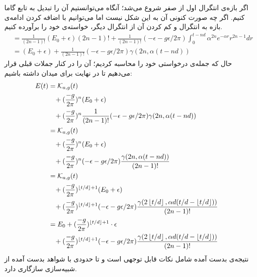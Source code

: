 اگر بازه‌ی انتگرال اول از صفر شروع می‌شد؛ آنگاه می‌توانستیم آن را تبدیل به تابع گاما کنیم. اگر چه صورت کنونی آن به این شکل نیست اما می‌توانیم با اضافه کردن ادامه‌ی بازه به انتگرال و کم کردن آن از انتگرال دیگر، خواسته‌ی خود را برآورده کنیم.
\begin{align}
	&= \frac{1}{(2n-1)!} (E_0 + \epsilon) (2n - 1)! + \frac{1}{(2n-1)!} ( - \epsilon - g\epsilon/2\pi) \int_{0}^{t - nd} \alpha^{2n} e^{-\alpha r} r^{2n-1} dr\\
	&= (E_0 + \epsilon) + \frac{1}{(2n-1)!} ( - \epsilon - g\epsilon/2\pi) \gamma(2n,\alpha( t-nd))
\end{align}
حال که جمله‌ی درخواستی خود را محاسبه کردیم؛ آن را در کنار جملات قبلی قرار می‌دهیم تا در نهایت برای میدان داشته باشیم:
\begin{align}
	E(t) &= \mathcal{K}_{a,g}(t) \\
	&\hspace{3mm}+ (\frac{-g}{2\pi})^n (E_0 + \epsilon) \\
	&\hspace{3mm}+ (\frac{-g}{2\pi})^n \frac{1}{(2n-1)!} ( - \epsilon - g\epsilon/2\pi) \gamma(2n,\alpha( t-nd))\\
	&= \mathcal{K}_{a,g}(t) \\
	&\hspace{3mm}+ (\frac{-g}{2\pi})^n (E_0 + \epsilon)\\
	&\hspace{3mm}+ (\frac{-g}{2\pi})^n ( - \epsilon - g\epsilon/2\pi) \frac{\gamma(2n,\alpha( t-nd))}{(2n-1)!}\\
	&= \mathcal{K}_{a,g}(t) \\
	&\hspace{3mm}+ (\frac{-g}{2\pi})^{\left\lfloor t/d \right\rfloor+1} (E_0 + \epsilon)\\
	&\hspace{3mm}+ (\frac{-g}{2\pi})^{\left\lfloor t/d \right\rfloor + 1} ( - \epsilon - g\epsilon/2\pi) \frac{\gamma(2\left\lfloor t/d \right\rfloor,\alpha d( t/d - \left\lfloor t/d \right\rfloor))}{(2n-1)!}\\
	&= E_0 + (\frac{-g}{2\pi})^{\left\lfloor t/d \right\rfloor+1} \cdot \epsilon\\
	&\hspace{3mm}+ (\frac{-g}{2\pi})^{\left\lfloor t/d \right\rfloor+1} ( - \epsilon - g\epsilon/2\pi) \frac{\gamma(2\left\lfloor t/d \right\rfloor,\alpha d( t/d - \left\lfloor t/d \right\rfloor))}{(2n-1)!}\\
\end{align}
نتیجه‌ی بدست آمده شامل نکات قابل توجهی است و تا حدودی با شواهد بدست آمده از شبیه‌سازی سازگاری دارد.
